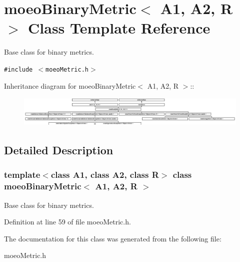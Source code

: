 \section{moeo\-Binary\-Metric$<$ A1, A2, R $>$ Class Template Reference}
\label{classmoeoBinaryMetric}
Base class for binary metrics.  


{\tt \#include $<$moeo\-Metric.h$>$}

Inheritance diagram for moeo\-Binary\-Metric$<$ A1, A2, R $>$::\begin{figure}[H]
\begin{center}
\leavevmode
\includegraphics[height=1.48018cm]{classmoeoBinaryMetric}
\end{center}
\end{figure}


\subsection{Detailed Description}
\subsubsection*{template$<$class A1, class A2, class R$>$ class moeo\-Binary\-Metric$<$ A1, A2, R $>$}

Base class for binary metrics. 



Definition at line 59 of file moeo\-Metric.h.

The documentation for this class was generated from the following file:\begin{CompactItemize}
\item 
moeo\-Metric.h\end{CompactItemize}
